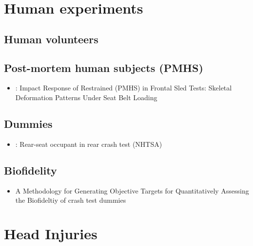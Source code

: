 \documentclass[]{book}
\providecommand{\tightlist}{%
  \setlength{\itemsep}{0pt}\setlength{\parskip}{0pt}}
\begin{document}
\hypertarget{human-experiments}{%
\chapter{Human experiments}\label{human-experiments}}

\hypertarget{human-volunteers}{%
\section{Human volunteers}\label{human-volunteers}}

\hypertarget{post-mortem-human-subjects-pmhs}{%
\section{Post-mortem human subjects (PMHS)}\label{post-mortem-human-subjects-pmhs}}

\begin{itemize}
\tightlist
\item
  \citep{Shaw2009} : Impact Response of Restrained (PMHS) in Frontal Sled Tests: Skeletal Deformation Patterns Under Seat Belt Loading
\end{itemize}

\hypertarget{dummies}{%
\section{Dummies}\label{dummies}}

\begin{itemize}
\tightlist
\item
  \citep{Viano2018}: Rear-seat occupant in rear crash test (NHTSA)
\end{itemize}

\hypertarget{biofidelity}{%
\section{Biofidelity}\label{biofidelity}}

\begin{itemize}
\tightlist
\item
  A Methodology for Generating Objective Targets for Quantitatively Assessing the Biofideltiy of crash test dummies \citep{Rhule2009}
\end{itemize}

\hypertarget{head-injuries}{%
\chapter{Head Injuries}\label{head-injuries}}
\end{document}
